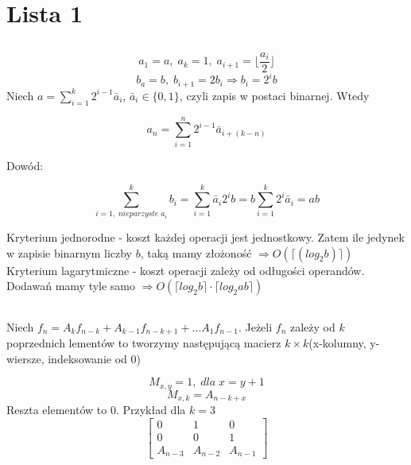 \documentclass[svgnames]{report}
\begin{document}
\chapter{Lista 1}

\section{}
\section{}
\section{}
\section{}
\[a_1 = a, \; a_k = 1, \; a_{i+1} = \lfloor \frac{a_i}{2}\rfloor\]
\[b_a = b, \; b_{i+1} = 2b_i \Rightarrow b_i = 2^ib \] 
Niech $a = \sum_{i=1}^k 2^{i-1}\bar{a}_i$, $\bar{a}_i \in \{ 0,1\}$, czyli zapis w postaci binarnej. Wtedy

\[a_n = \sum_{i=1}^n 2^{i-1}\bar{a}_{i+(k-n)}\]

Dowód:

\[\sum_{i=1, \; nieparzyste \; a_i}^k b_i = \sum_{i=1}^k\bar{a}_i2^ib = b\sum_{i=1}^k2^i\bar{a}_i = ab\]

Kryterium jednorodne - koszt każdej operacji jest jednostkowy. Zatem ile jedynek w zapisie binarnym liczby $b$, taką mamy złożoność $\Rightarrow O(\lceil(log_2b)\rceil)$ \\
Kryterium lagarytmiczne - koszt operacji zależy od odługości operandów. Dodawań mamy tyle samo $\Rightarrow O(\lceil log_2b\rceil \cdot \lceil log_2 ab\rceil)$



\section{}

Niech $f_n = A_kf_{n-k} + A_{k-1}f_{n-k+1} + \ldots A_1f_{n-1}$. Jeżeli $f_n$ zależy od $k$ poprzednich lementów to tworzymy następującą macierz $k\times k$(x-kolumny, y-wiersze, indeksowanie od 0)

\[M_{x,y} = 1, \; dla \;x=y+1\]
\[M_{x,k} = A_{n- k + x}\]
Reszta elementów to 0. Przykład dla $k=3$
\[ 
 \left[
 	\begin{array}{ccc}
 	0		&	1		&	0\\
 	0		&	0		&	1\\
 	A_{n-3}	&	A_{n-2}	&	A_{n-1}
 	\end{array}
 \right]
\] 
\end{document}
